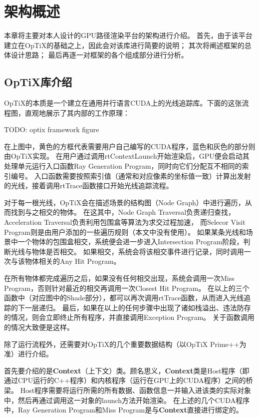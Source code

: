 \chapter{架构概述}
\label{cha:pipeline}

本章将主要对本人设计的GPU路径渲染平台的架构进行介绍。
首先，由于该平台建立在OpTiX的基础之上，因此会对该库进行简要的说明；
其次将阐述框架的总体设计思路；
最后再逐一对框架的各个组成部分进行分析。

\section{OpTiX库介绍}

OpTiX的本质是一个建立在通用并行语言CUDA上的光线追踪库。下面的这张流程图，直观地展示了其内部的工作原理：

TODO: optix framework figure

在上图中，黄色的方框代表需要用户自己编写的CUDA程序，蓝色和灰色的部分则由OpTiX实现。
在用户通过调用rtContextLaunch开始渲染后，GPU便会启动其处理单元运行入口函数Ray Generation Program，同时向它们分配互不相同的索引编号。
入口函数需要按照索引值（通常和对应像素的坐标值一致）计算出发射的光线，接着调用rtTrace函数接口开始光线追踪流程。

对于每一根光线，OpTiX会在描述场景的结构图（Node Graph）中进行遍历，从而找到与之相交的物体。
在这其中，Node Graph Traversal负责递归查找，Acceleration Traversal负责利用包围盒等算法为求交过程加速，
而Selecor Visit Program则是由用户添加的一些遍历规则（本文中没有使用）。
如果某条光线和场景中一个物体的包围盒相交，系统便会进一步进入Intersection Program阶段，判断光线与物体是否相交。
如果相交，系统会将该相交事件进行记录，同时调用一次与该物体相关的Any Hit Program。

在所有物体都完成遍历之后，如果没有任何相交出现，系统会调用一次Miss Program，否则针对最近的相交再调用一次Closest Hit Program。
在以上的三个函数中（对应图中的Shade部分），都可以再次调用rtTrace函数，从而进入光线追踪的下一层递归。
最后，如果在以上的任何步骤中出现了诸如栈溢出、违法防存的情况，则会立即终止所有程序，并直接调用Exception Program。
关于函数调用的情况大致便是这样。

除了运行流程外，还需要对OpTiX的几个重要数据结构（以OpTiX Prime++为准）进行介绍。

首先要介绍的是\textbf{Context}（上下文）类。顾名思义，\textbf{Context}类是Host程序（即通过CPU运行的C++程序）和内核程序（运行在GPU上的CUDA程序）之间的桥梁。
Host程序需要将运行所需的所有数据、函数信息一并输入进该类的实际对象中，然后再通过调用这一对象的launch方法开始渲染。
在上述的几个CUDA程序中，Ray Generation Program和Miss Program是与\textbf{Context}直接进行绑定的。

